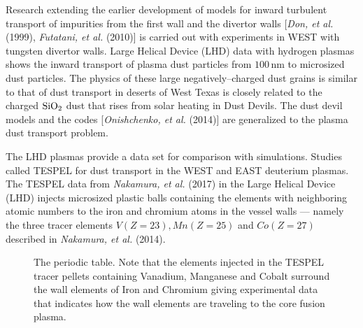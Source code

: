 \documentclass[a4paper,openany,12pt]{report}
\begin{document}
Research extending the earlier development of models for inward turbulent transport of impurities from the first wall and the divertor walls [\emph{Don, et al.} (1999), \emph{Futatani, et al.} (2010)] is carried out with experiments in WEST with tungsten divertor walls. Large Helical Device (LHD) data with hydrogen plasmas shows the inward transport of plasma dust particles from $100\,$nm to microsized dust particles. The physics of these large negatively--charged dust grains is similar to that of dust transport in deserts of West Texas is closely related to the charged $\rm SiO_2$ dust that rises from solar heating in Dust Devils. The dust devil models and the codes [\emph{Onishchenko, et al.} (2014)] are generalized to the plasma dust transport problem.

The LHD plasmas provide a data set for comparison with simulations. Studies called TESPEL for dust transport in the WEST and EAST deuterium plasmas. The TESPEL data from \emph{Nakamura, et al.} (2017) in the Large Helical Device (LHD) injects microsized plastic balls containing the elements with neighboring atomic numbers to the iron and chromium atoms in the vessel walls --- namely the three tracer elements $V(Z=23), Mn(Z=25)$ and $Co(Z=27)$ described in \emph{Nakamura, et al.} (2014).
%
\begin{figure}[H]
\renewcommand{\thefigure}{4.2}
\centerline{}%
\caption{The periodic table.  Note that the elements injected in the TESPEL tracer pellets containing Vanadium, Manganese and Cobalt surround the wall elements of Iron and Chromium giving experimental
data that indicates how the wall elements are traveling to the core fusion plasma.}
\label{F9.42}
\end{figure}
%
\end{document}
